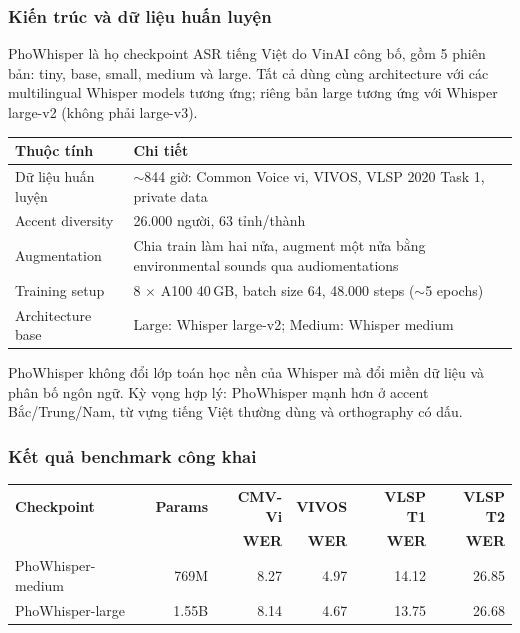 \subsubsection{Kiến trúc và dữ liệu huấn luyện}

PhoWhisper là họ checkpoint ASR tiếng Việt do VinAI công bố, gồm 5 phiên bản: tiny, base, small, medium và large. Tất cả dùng cùng architecture với các multilingual Whisper models tương ứng; riêng bản large tương ứng với Whisper large-v2 (không phải large-v3).

\begin{longtable}{p{4cm} p{10cm}}
\toprule
\textbf{Thuộc tính} & \textbf{Chi tiết} \\
\midrule
Dữ liệu huấn luyện & $\sim$844 giờ: Common Voice vi, VIVOS, VLSP 2020 Task 1, private data \\
\midrule
Accent diversity & 26.000 người, 63 tỉnh/thành \\
\midrule
Augmentation & Chia train làm hai nửa, augment một nửa bằng environmental sounds qua audiomentations \\
\midrule
Training setup & 8 $\times$ A100 40\,GB, batch size 64, 48.000 steps ($\sim$5 epochs) \\
\midrule
Architecture base & Large: Whisper large-v2; Medium: Whisper medium \\
\bottomrule
\end{longtable}

PhoWhisper không đổi lớp toán học nền của Whisper mà đổi miền dữ liệu và phân bố ngôn ngữ. Kỳ vọng hợp lý: PhoWhisper mạnh hơn ở accent Bắc/Trung/Nam, từ vựng tiếng Việt thường dùng và orthography có dấu.

\subsubsection{Kết quả benchmark công khai}

\begin{longtable}{l r r r r r}
\toprule
\textbf{Checkpoint} & \textbf{Params} & \textbf{CMV-Vi} & \textbf{VIVOS} & \textbf{VLSP T1} & \textbf{VLSP T2} \\
 & & \textbf{WER} & \textbf{WER} & \textbf{WER} & \textbf{WER} \\
\midrule
PhoWhisper-medium & 769M & 8.27 & 4.97 & 14.12 & 26.85 \\
PhoWhisper-large & 1.55B & 8.14 & 4.67 & 13.75 & 26.68 \\
\bottomrule
\end{longtable}

